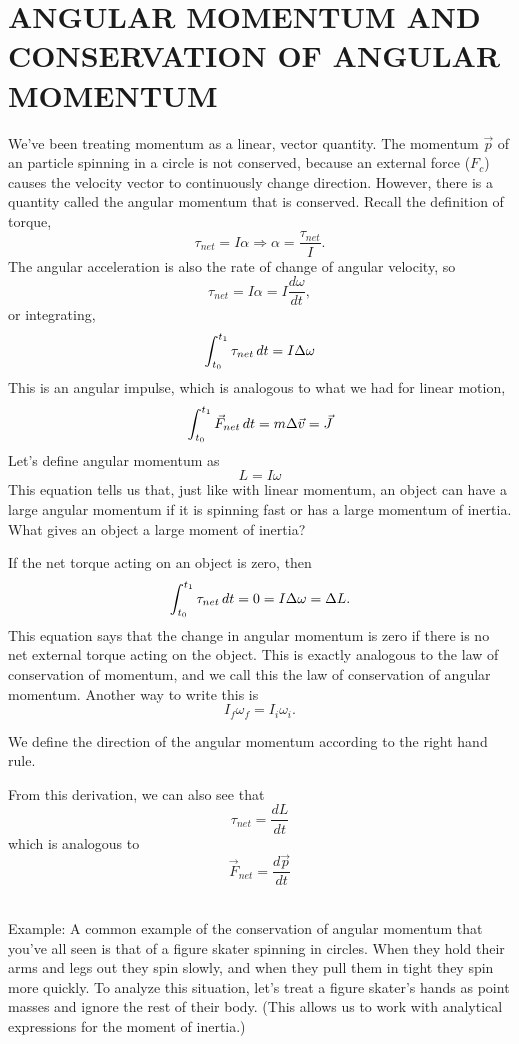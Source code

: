 \section{ANGULAR MOMENTUM AND CONSERVATION OF ANGULAR MOMENTUM}
We've been treating momentum as a linear, vector quantity. The momentum $\vec{p}$ of an particle spinning in a circle is not conserved, because an external force ($F_c$) causes the velocity vector to continuously change direction. However, there is a quantity called the angular momentum that is conserved. Recall the definition of torque,
$$\tau_{net}=I\alpha\Rightarrow \alpha=\frac{\tau_{net}}{I}.$$
The angular acceleration is also the rate of change of angular velocity, so 
$$\tau_{net}=I\alpha=I\frac{d\omega}{d{t}},$$
or integrating,
$$\displaystyle\int_{t_0}^{t_1}\tau_{net}\,dt=I\Delta{\omega}$$
This is an angular impulse, which is analogous to what we had for linear motion,
$$\displaystyle\int_{t_0}^{t_1}\vec{F}_{net}\,dt=m\Delta{\vec{v}}=\vec{J}$$
Let's define angular momentum as
$$\boxed{L=I\omega}$$
This equation tells us that, just like with linear momentum, an object can have a large angular momentum if it is spinning fast or has a large momentum of inertia. What gives an object a large moment of inertia?

If the net torque acting on an object is zero, then
$$\displaystyle\int_{t_0}^{t_1}\tau_{net}\,{dt}=0=I\Delta\omega=\Delta{L}.$$
This equation says that the change in angular momentum is zero if there is no net external torque acting on the object. This is exactly analogous to the law of conservation of momentum, and we call this the law of conservation of angular momentum. Another way to write this is
$$\boxed{I_f\omega_f=I_i\omega_i}.$$

We define the direction of the angular momentum according to the right hand rule.
\vspace{5cm}

From this derivation, we can also see that
$$\tau_{net}=\frac{dL}{dt}$$
which is analogous to 
$$\vec F_{net}=\frac{d\vec{p}}{dt}$$

\hrulefill\\
Example: A common example of the conservation of angular momentum that you've all seen is that of a figure skater spinning in circles. When they hold their arms and legs out they spin slowly, and when they pull them in tight they spin more quickly. To analyze this situation, let's treat a figure skater's hands as point masses and ignore the rest of their body. (This allows us to work with analytical expressions for the moment of inertia.)

